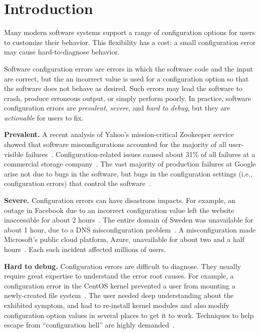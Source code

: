 
\section{Introduction}
\label{sec:introduction}

Many modern software systems support %
a range of configuration options for users to
customize their behavior. This flexibility has a cost:
a small configuration error may cause hard-to-diagnose
behavior.

Software configuration errors are errors in which
the software code and the input are correct, but the an incorrect
value is used for a configuration option so that the software does not behave
as desired. Such errors may lead
the software to crash,
produce erroneous output, or simply perform poorly.
In practice, software configuration
errors are \textit{prevalent}, \textit{severe}, and
\textit{hard to debug}, but they are \textit{actionable} for users to fix.


\textbf{Prevalent.} A recent analysis of Yahoo's mission-critical Zookeeper service
showed that software misconfigurations accounted for
the majority of all user-visible failures~\cite{bft}.
Configuration-related issues caused about 31\% of all
failures at a commercial storage company~\cite{Yin:2011:ESC}.
The vast majority of production failures at Google
arise not due to bugs in the software, but bugs in the
configuration settings (i.e., configuration errors)
that control the software~\cite{googleconf}.

\textbf{Severe.}
Configuration errors can have disastrous impacts. For example,
an outage in Facebook due to
an incorrect configuration value left the website 
inaccessible for about 2 hours~\cite{fbout}. 
The entire  domain of Sweden was unavailable
for about 1 hour, due to a DNS misconfiguration problem~\cite{sedown}.
A misconfiguration made 
Microsoft's public cloud platform, Azure,
unavailable for about two and a half hours~\cite{msdown}.
Each such incident affected millions of users.

\textbf{Hard to debug.}
Configuration errors are difficult to diagnose. 
They usually require great expertise to understand
the error root causes. For example, a
configuration error in the CentOS kernel prevented
a user from mounting a newly-created file system~\cite{Yin:2011:ESC}.
The user needed deep understanding about the
exhibited symptom,  and had to re-install kernel modules and
also modify configuration option values in
several places to get it to work.
Techniques to help escape from ``configuration hell''
are highly demanded~\cite{googleconf}.

